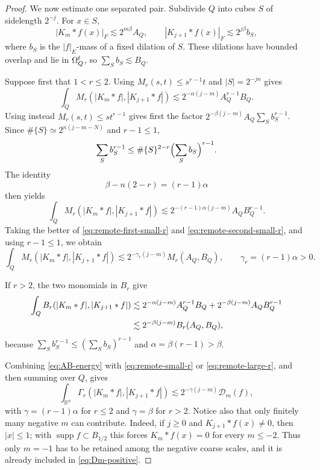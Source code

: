 \documentclass[11pt]{amsart}
\numberwithin{equation}{section}
\theoremstyle{definition}
\theoremstyle{remark}
\newcommand{\R}{\mathbb R}
\newcommand{\supp}{\operatorname{supp}}
\begin{document}
\begin{proof}
We now estimate one separated pair.  Subdivide $Q$ into cubes $S$ of
sidelength $2^{-j}$.  For $x\in S$,
\begin{equation}\label{eq:remote-pointwise}
 |K_m*f(x)|_F\lesssim2^{m\beta}A_Q,
 \qquad
 |K_{j+1}*f(x)|_F\lesssim2^{j\beta}b_S,
\end{equation}
where $b_S$ is the $|f|_E$-mass of a fixed dilation of $S$.  These dilations
have bounded overlap and lie in $\Omega_Q^{\rm f}$, so
$\sum_Sb_S\lesssim B_Q$.

Suppose first that $1<r\le2$.  Using $M_r(s,t)\le s^{r-1}t$ and
$|S|=2^{-jn}$ gives
\begin{equation}\label{eq:remote-first-small-r}
 \int_QM_r(|K_m*f|,|K_{j+1}*f|)
 \lesssim2^{-\alpha(j-m)}A_Q^{r-1}B_Q.
\end{equation}
Using instead $M_r(s,t)\le st^{r-1}$ gives first the factor
$2^{-\beta(j-m)}A_Q\sum_Sb_S^{r-1}$.  Since
$\#\{S\}\simeq2^{n(j-m-N)}$ and $r-1\le1$,
\[
 \sum_Sb_S^{r-1}
 \le \#\{S\}^{2-r}\Bigl(\sum_Sb_S\Bigr)^{r-1}.
\]
The identity
\begin{equation}\label{eq:small-r-exponent}
 \beta-n(2-r)=(r-1)\alpha
\end{equation}
then yields
\begin{equation}\label{eq:remote-second-small-r}
 \int_QM_r(|K_m*f|,|K_{j+1}*f|)
 \lesssim2^{-(r-1)\alpha(j-m)}A_QB_Q^{r-1}.
\end{equation}
Taking the better of \eqref{eq:remote-first-small-r} and
\eqref{eq:remote-second-small-r}, and using $r-1\le1$, we obtain
\begin{equation}\label{eq:remote-small-r}
 \int_QM_r(|K_m*f|,|K_{j+1}*f|)
 \lesssim2^{-\gamma_r(j-m)}M_r(A_Q,B_Q),
 \qquad \gamma_r=(r-1)\alpha>0.
\end{equation}

If $r>2$, the two monomials in $B_r$ give
\begin{align}
 \int_QB_r(|K_m*f|,|K_{j+1}*f|)
 &\lesssim2^{-\alpha(j-m)}A_Q^{r-1}B_Q
       +2^{-\beta(j-m)}A_QB_Q^{r-1}\notag\\
 &\lesssim2^{-\beta(j-m)}B_r(A_Q,B_Q),
 \label{eq:remote-large-r}
\end{align}
because $\sum_Sb_S^{r-1}\le(\sum_Sb_S)^{r-1}$ and
$\alpha=\beta(r-1)>\beta$.

Combining \eqref{eq:AB-energy} with \eqref{eq:remote-small-r} or
\eqref{eq:remote-large-r}, and then summing over $Q$, gives
\begin{equation}\label{eq:remote-Dm}
 \int_{\R^n}\Gamma_r(|K_m*f|,|K_{j+1}*f|)
 \lesssim2^{-\gamma(j-m)}\mathcal D_m(f),
\end{equation}
with $\gamma=(r-1)\alpha$ for $r\le2$ and $\gamma=\beta$ for $r>2$.
Notice also that only finitely many negative $m$ can contribute.  Indeed, if
$j\ge0$ and $K_{j+1}*f(x)\ne0$, then $|x|\le1$; with
$\supp f\subset B_{1/2}$ this forces $K_m*f(x)=0$ for every $m\le-2$.
Thus only $m=-1$ has to be retained among the negative coarse scales, and it
is already included in \eqref{eq:Dm-positive}.


\end{proof}
\end{document}
